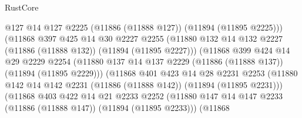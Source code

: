 \begin{lexlean}{RustCore}
\begin{coremodule}
                              @127
                              @14
                              @127
                              @2225
                              (@11886 (@11888 @127))
                              (@11894 (@11895 @2225)))
                            (@11868
                              @397
                              @425
                              @14
                              @30
                              @2227
                              @2255
                              (@11880
                                @132
                                @14
                                @132
                                @2227
                                (@11886 (@11888 @132))
                                (@11894 (@11895 @2227)))
                              (@11868
                                @399
                                @424
                                @14
                                @29
                                @2229
                                @2254
                                (@11880
                                  @137
                                  @14
                                  @137
                                  @2229
                                  (@11886 (@11888 @137))
                                  (@11894 (@11895 @2229)))
                                (@11868
                                  @401
                                  @423
                                  @14
                                  @28
                                  @2231
                                  @2253
                                  (@11880
                                    @142
                                    @14
                                    @142
                                    @2231
                                    (@11886 (@11888 @142))
                                    (@11894 (@11895 @2231)))
                                  (@11868
                                    @403
                                    @422
                                    @14
                                    @21
                                    @2233
                                    @2252
                                    (@11880
                                      @147
                                      @14
                                      @147
                                      @2233
                                      (@11886 (@11888 @147))
                                      (@11894 (@11895 @2233)))
                                    (@11868

\end{coremodule}
\end{lexlean}
